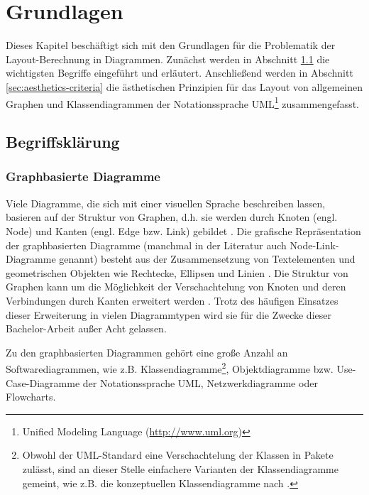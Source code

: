 
\chapter{Grundlagen}
\label{chapter:basics}

Dieses Kapitel beschäftigt sich mit den Grundlagen für die Problematik der Layout-Berechnung in Diagrammen. Zunächst werden in Abschnitt \ref{sec:disambiguation} die wichtigsten Begriffe eingeführt und erläutert. Anschließend werden in Abschnitt \ref{sec:aesthetics-criteria} die ästhetischen Prinzipien für das Layout von allgemeinen Graphen und Klassendiagrammen der Notationssprache UML\footnote{Unified Modeling Language (\url{http://www.uml.org})} zusammengefasst.

\section{Begriffsklärung}
\label{sec:disambiguation}

\subsection{Graphbasierte Diagramme}
\label{subsec:graph-based-diagrams}

Viele Diagramme, die sich mit einer visuellen Sprache beschreiben lassen, basieren auf der Struktur von Graphen, d.h. sie werden durch Knoten (engl. Node) und Kanten (engl. Edge bzw. Link) gebildet \cite{Eichelberger05Aesthetics}. Die grafische Repräsentation der graphbasierten Diagramme (manchmal in der Literatur auch Node-Link-Diagramme genannt) besteht aus der Zusammensetzung von Textelementen und geometrischen Objekten wie Rechtecke, Ellipsen und Linien \cite{Wybrow08Using}. Die Struktur von Graphen kann um die Möglichkeit der Verschachtelung von Knoten und deren Verbindungen durch Kanten erweitert werden \cite{Siebenhaller03Automatisches, Wybrow08Using}. Trotz des häufigen Einsatzes dieser Erweiterung in vielen Diagrammtypen wird sie für die Zwecke dieser Bachelor-Arbeit außer Acht gelassen.

Zu den graphbasierten Diagrammen gehört eine große Anzahl an Softwarediagrammen, wie z.B. Klassendiagramme\footnote{Obwohl der UML-Standard eine Verschachtelung der Klassen in Pakete zulässt, sind an dieser Stelle einfachere Varianten der Klassendiagramme gemeint, wie z.B. die konzeptuellen Klassendiagramme nach \cite{Ambler04UML-2-Class}.}, Objektdiagramme bzw. Use-Case-Diagramme der Notationssprache UML, Netzwerkdiagramme oder Flowcharts.

